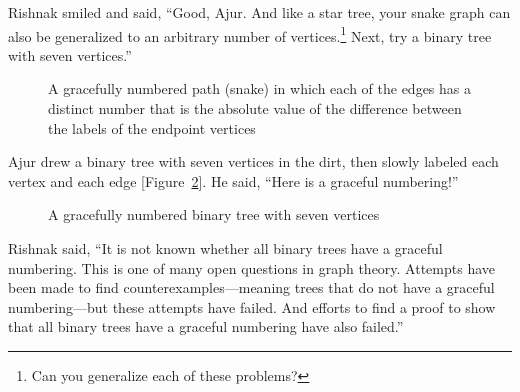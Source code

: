 Rishnak smiled and said, ``Good, Ajur. And like a star tree, your snake graph can also be generalized to an arbitrary number of vertices.\footnote{Can you generalize each of these problems?} Next, try a binary tree with seven vertices.''

\begin{figure}
\begin{center}
\caption{A gracefully numbered path (snake) in which each of the edges has a distinct number that is the absolute value of the difference between the labels of the endpoint vertices}\label{19g2}
\end{center}
\end{figure}

Ajur drew a binary tree with seven vertices in the dirt, then slowly labeled each vertex and each edge [Figure~\ref{19g3}]. He said, ``Here is a graceful numbering!''

\begin{figure}
\begin{center}


\caption{A gracefully numbered binary tree with seven vertices}\label{19g3}
\end{center}
\end{figure}

Rishnak said, ``It is not known whether all binary trees have a graceful numbering. This is one of many open questions in graph theory. Attempts have been made to find counterexamples---meaning trees that do not have a graceful numbering---but these attempts have failed. And efforts to find a proof to show that all binary trees have a graceful numbering have also failed.''

